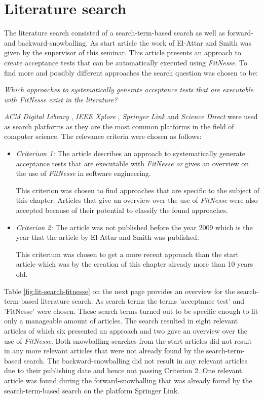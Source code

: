 \section{Literature search}
\label{sec:literature-search}

The literature search consisted of a search-term-based search as well as forward- and backward-snowballing.
As start article the work of El-Attar and Smith \cite{el-attar} was given by the supervisor of this seminar.
This article presents an approach to create acceptance tests that can be automatically executed using \textit{FitNesse}.
To find more and possibly different approaches the search question was chosen to be:

\begin{center}
\textit{
 Which approaches to systematically generate acceptance tests that are executable with \textit{FitNesse} exist in the literature?
}
\end{center}

\textit{ACM Digital Library} \cite{acm}, \textit{IEEE Xplore} \cite{ieee}, \textit{Springer Link} \cite{springer} and \textit{Science Direct} \cite{elsevier} were used as search platforms as they are the most common platforms in the field of computer science.
The relevance criteria were chosen as follows:
\begin{itemize}
	\item \textit{Criterium 1:} The article describes an approach to systematically generate acceptance tests that are executable with \textit{FitNesse} \textit{or} gives an overview on the use of \textit{FitNesse} in software engineering.
	
	This criterion was chosen to find approaches that are specific to the subject of this chapter.
	Articles that give an overview over the use of \textit{FitNesse} were also accepted because of their potential to classify the found approaches.
	
	\item \textit{Criterion 2:} The article was not published before the year 2009 which is the year that the article by El-Attar and Smith was published.
	
	This criterium was chosen to get a more recent approach than the start article which was by the creation of this chapter already more than 10 years old.
\end{itemize}

Table \ref{fig:lit-search-fitnesse} on the next page provides an overview for the search-term-based literature search.
As search terms the terms 'acceptance test' and 'FitNesse' were chosen.
These search terms turned out to be specific enough to fit only a manageable amount of articles.
The search resulted in eight relevant articles of which six presented an approach and two gave an overview over the use of \textit{FitNesse}.
Both snowballing searches from the start articles did not result in any more relevant articles that were not already found by the search-term-based search.
The backward-snowballing did not result in any relevant articles due to their publishing date and hence not passing Criterion 2.
One relevant article was found during the forward-snowballing that was already found by the search-term-based search on the platform Springer Link.

